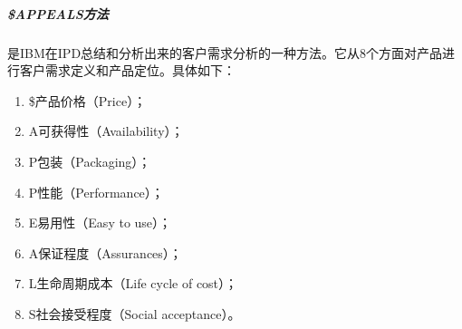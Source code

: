 \documentclass[letterpaper,11pt,english]{sphinxmanual}
\begin{document}
\subparagraph{\$APPEALS方法}
\label{\detokenize{chapter_knowledge/BRD:appeals}}
是IBM在IPD总结和分析出来的客户需求分析的一种方法。它从8个方面对产品进行客户需求定义和产品定位。具体如下：
%
\begin{footnote}[423]\sphinxAtStartFootnote
{}
%
\end{footnote}
\begin{enumerate}
%
\item {} 
\$\sphinxhyphen{}产品价格（Price）；

\item {} 
A\sphinxhyphen{}可获得性（Availability）；

\item {} 
P\sphinxhyphen{}包装（Packaging）；

\item {} 
P\sphinxhyphen{}性能（Performance）；

\item {} 
E\sphinxhyphen{}易用性（Easy to use）；

\item {} 
A\sphinxhyphen{}保证程度（Assurances）；

\item {} 
L\sphinxhyphen{}生命周期成本（Life cycle of cost）；

\item {} 
S\sphinxhyphen{}社会接受程度（Social acceptance）。

\end{enumerate}
\end{document}
